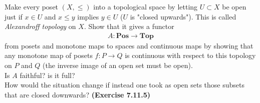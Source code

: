 Make every poset $(X, \le)$ into a topological space by letting $U \subset X$ be open just if $x \in U$ and $x \le y$ implies $y \in U$ ($U$ is "closed upwards"). This is called \textit{Alexandroff topology} on $X$. Show that it gives a functor 
\begin{gather*}
    A: \textbf{Pos} \to \textbf{Top}
\end{gather*}
from posets and monotone maps to spaces and continuous maps by showing that any monotone map of posets $f: P \to Q$ is continuous with respect to this topology on $P$ and $Q$ (the inverse image of an open set must be open). \\
Is $A$ faithful? is it full? \\
How would the situation change if instead one took as open sets those subsets that are closed downwards? \textbf{(Exercise 7.11.5)}